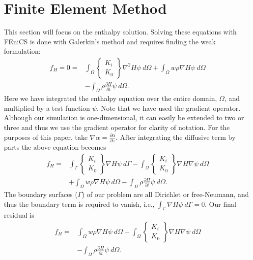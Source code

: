 \documentclass{article}%
\begin{document}
\section{Finite Element Method}

This section will focus on the enthalpy solution.  Solving these equations with FEniCS is done with Galerkin's method and requires finding the weak formulation:
\begin{align*}
    f_H = 0 =
    &\int_{\Omega} 
      \begin{Bmatrix}
        K_i\\
        K_0
      \end{Bmatrix}
      \nabla^2 H \psi\ d \Omega 
    + \int_{\Omega}w \rho \nabla H \psi\ d \Omega \\
    &- \int_{\Omega} {\rho \frac{\partial H}{\partial t}} \psi\ d \Omega.
\end{align*}
Here we have integrated the enthalpy equation over the entire domain, $\Omega$, and multiplied by a test function $\psi$.  Note that we have used the gradient operator.  Although our simulation is one-dimensional, it can easily be extended to two or three and thus we use the gradient operator for clarity of notation.  For the purposes of this paper, take $\nabla{\alpha} = \frac{\partial \alpha}{\partial z}$.  After integrating the diffusive term by parts the above equation becomes
\begin{align*}
    f_H =
    & \int_{\Gamma} 
        \begin{Bmatrix}
          K_i\\
          K_0
        \end{Bmatrix}
        \nabla H \psi\ d \Gamma
    - \int_{\Omega} 
        \begin{Bmatrix}
          K_i\\
          K_0
        \end{Bmatrix}
        \nabla H \nabla \psi\ d \Omega \\ 
    &+ \int_{\Omega}w \rho \nabla H \psi\ d \Omega
    - \int_{\Omega} {\rho \frac{\partial H}{\partial t}} \psi\ d \Omega.
\end{align*}
The boundary surfaces ($\Gamma$) of our problem are all Dirichlet or free-Neumann, and thus the boundary term is required to vanish, i.e., $\int_{\Gamma} \nabla H \psi\ d \Gamma = 0$.  Our final residual is
\begin{align*}
    f_H =
    &\int_{\Omega}w \rho \nabla H \psi\ d \Omega
    - \int_{\Omega} 
        \begin{Bmatrix}
          K_i\\
          K_0
        \end{Bmatrix}
        \nabla H \nabla \psi\ d \Omega \\ 
    &- \int_{\Omega} {\rho \frac{\partial H}{\partial t}} \psi\ d \Omega.
\end{align*}
\end{document}
